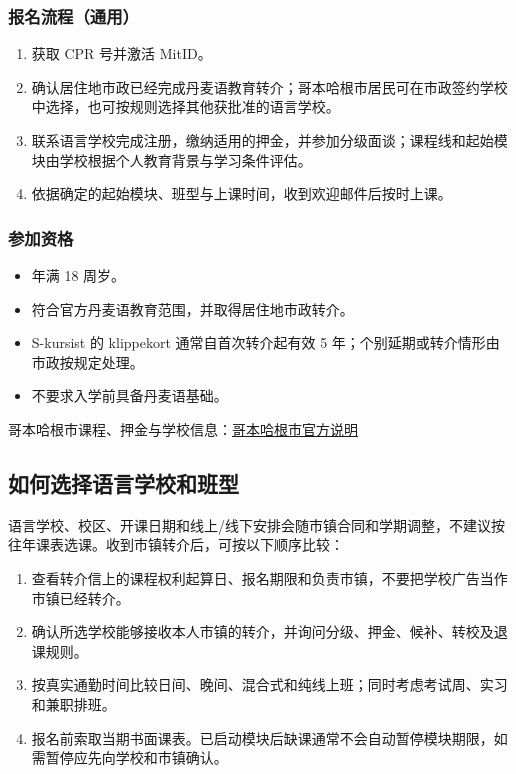 \subsubsection{报名流程（通用）}
\begin{enumerate}
    \item 获取 CPR 号并激活 MitID。
    \item 确认居住地市政已经完成丹麦语教育转介；哥本哈根市居民可在市政签约学校中选择，也可按规则选择其他获批准的语言学校。
    \item 联系语言学校完成注册，缴纳适用的押金，并参加分级面谈；课程线和起始模块由学校根据个人教育背景与学习条件评估。
    \item 依据确定的起始模块、班型与上课时间，收到欢迎邮件后按时上课。
\end{enumerate}

\subsubsection{参加资格}
\begin{itemize}
    \item 年满 18 周岁。
    \item 符合官方丹麦语教育范围，并取得居住地市政转介。
    \item S-kursist 的 klippekort 通常自首次转介起有效 5 年；个别延期或转介情形由市政按规定处理。
    \item 不要求入学前具备丹麦语基础。
\end{itemize}

哥本哈根市课程、押金与学校信息：\href{https://international.kk.dk/live/learn-danish/danish-language-courses/danish-language-education-programme}{哥本哈根市官方说明}

\subsection{如何选择语言学校和班型}

语言学校、校区、开课日期和线上/线下安排会随市镇合同和学期调整，不建议按往年课表选课。收到市镇转介后，可按以下顺序比较：

\begin{enumerate}
    \item 查看转介信上的课程权利起算日、报名期限和负责市镇，不要把学校广告当作市镇已经转介。
    \item 确认所选学校能够接收本人市镇的转介，并询问分级、押金、候补、转校及退课规则。
    \item 按真实通勤时间比较日间、晚间、混合式和纯线上班；同时考虑考试周、实习和兼职排班。
    \item 报名前索取当期书面课表。已启动模块后缺课通常不会自动暂停模块期限，如需暂停应先向学校和市镇确认。
\end{enumerate}

